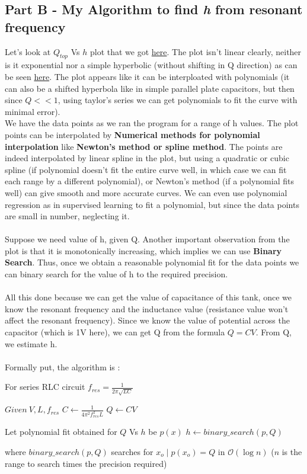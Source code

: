 \documentclass[11pt, a4paper]{article}
\begin{document}
\subsection{Part B - My Algorithm to find \textit{h} from resonant frequency}
Let's look at $Q_{top}$ Vs $h$ plot that we got \hyperref[fig:qtop]{here}. The plot isn't linear clearly, neither is it exponential nor a simple hyperbolic (without shifting in Q direction)
as can be seen \hyperref[fig:qtop_semilog]{here}. The plot appears like it can be interploated with polynomials (it can also be a shifted hyperbola like in simple parallel plate capacitors, but then since $Q << 1$, using taylor's series we can get polynomials to fit the curve with minimal error).
\\
We have the data points as we ran the program for a range of h values. The plot points can be interpolated by \textbf{Numerical methods for polynomial interpolation} like \textbf{Newton's method or spline method}.
The points are indeed interpolated by linear spline in the plot, but using a quadratic or cubic spline (if polynomial doesn't fit the entire curve well, in which case we can fit each range by a different polynomial), or Newton's method (if a polynomial fits well) can give smooth and more accurate curves.
We can even use polynomial regression as in supervised learning to fit a polynomial, but since the data points are small in number, neglecting it.
\\ \\
Suppose we need value of h, given Q. Another important observation from the plot is that it is monotonically increasing, which implies we can use \textbf{Binary Search}.
Thus, once we obtain a reasonable polynomial fit for the data points we can binary search for the value of h to the required precision.
\\ \\
All this done because we can get the value of capacitance of this tank, once we know the resonant frequency and the inductance value (resistance value won't affect the resonant frequency).
Since we know the value of potential across the capacitor (which is 1V here), we can get Q from the formula $Q = CV$. 
From Q, we estimate h.
\\ \\
Formally put, the algorithm is :
\begin{algorithmic}
\STATE For series RLC circuit $f_{res} = \frac{1}{2\pi\sqrt{LC}}$

\STATE $Given\ V,L,f_{res}$
\STATE $C \gets \frac{1}{4 \pi^2 f_{res}^2 L}$
\vspace{0.1in}
\STATE $Q \gets CV$

\STATE Let polynomial fit obtained for $Q$ Vs $h$ be $p(x)$ 
\STATE $h \gets binary\_search(p,Q)$
\end{algorithmic}
where $binary\_search(p,Q)$ searches for $x_o \mid p(x_o) = Q$ in $\mathcal{O}(\log n)$
($n$ is the range to search times the precision required)
\end{document}
